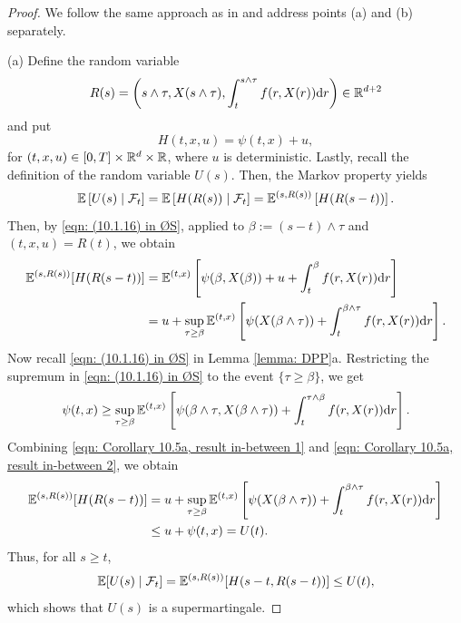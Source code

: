\begin{proof}
    We follow the same approach as in {\cite[see Proof of Corollary 10.5]{oksendal2007applied}} and address points (a) and (b) separately. 
    
    (a) Define the random variable 
    \begin{equation*}
        R(s) = \left(s \wedge \tau, X(s \wedge \tau), \int_t^{s \wedge \tau} f(r,X(r)) \mathrm{d} r \right) \in \mathbb R^{d+2}
    \end{equation*}
    and put 
    \begin{equation*}
        H(t,x,u) = \psi(t,x) + u,
    \end{equation*}
    for $(t,x,u) \in [0,T] \times \mathbb{R}^d \times \mathbb{R}$, where $u$ is deterministic. Lastly, recall the definition of the random variable $U(s)$. Then, the Markov property yields
    \begin{equation*}
        \mathbb{E} \left[U(s) \mid \mathcal{F}_t \right] = \mathbb{E}\left[ H(R(s)) \mid \mathcal{F}_t \right] = \mathbb{E}^{(s,R(s))} \left[ H(R(s-t)) \right].
    \end{equation*}
    Then, by \eqref{eqn: (10.1.16) in ØS}, applied to $\beta:=(s-t)\wedge \tau$ and $(t,x,u) = R(t)$, we obtain
    \begin{align}
        \mathbb{E}^{(s,R(s))}[H(R(s-t))] &= \mathbb{E}^{(t,x)} \left[ \psi(\beta, X(\beta)) + u + \int_t^{\beta} f(r,X(r)) \mathrm{d} r \right] \nonumber \\
        & = u + \sup_{\tau \geq \beta} \mathbb{E}^{(t,x)}\left[ \psi(X(\beta \wedge\tau)) + \int_t^{\beta \wedge \tau} f(r,X(r)) \mathrm{d} r \right].
        \label{eqn: Corollary 10.5a, result in-between 1}
    \end{align}
    Now recall \eqref{eqn: (10.1.16) in ØS} in Lemma \ref{lemma: DPP}a. Restricting the supremum in \eqref{eqn: (10.1.16) in ØS} to the event $\{\tau \geq \beta\}$, we get 
    \begin{equation}
        \psi(t,x) \geq \sup_{\tau \geq \beta} \mathbb{E}^{(t,x)} \left[ \psi(\beta \wedge \tau, X(\beta \wedge \tau)) + \int_{t}^{\tau \wedge \beta} f(r,X(r)) \mathrm{d} r \right]. 
        \label{eqn: Corollary 10.5a, result in-between 2}
    \end{equation}
    Combining \eqref{eqn: Corollary 10.5a, result in-between 1} and \eqref{eqn: Corollary 10.5a, result in-between 2}, we obtain
    \begin{align*}
        \mathbb{E}^{(s,R(s))}[H(R(s-t))] &= u + \sup_{\tau \geq \beta} \mathbb{E}^{(t,x)}\left[ \psi(X(\beta \wedge\tau)) + \int_t^{\beta \wedge \tau} f(r,X(r)) \mathrm{d} r \right] \\
        & \leq u + \psi(t,x) = U(t).
    \end{align*}
    Thus, for all $s \geq t$,
    \begin{equation*}
        \mathbb{E}[U(s) \mid \mathcal{F}_t] = \mathbb{E}^{(s,R(s))}[H(s-t,R(s-t))] \leq U(t),
    \end{equation*}
    which shows that $U(s)$ is a supermartingale. 


\end{proof}
